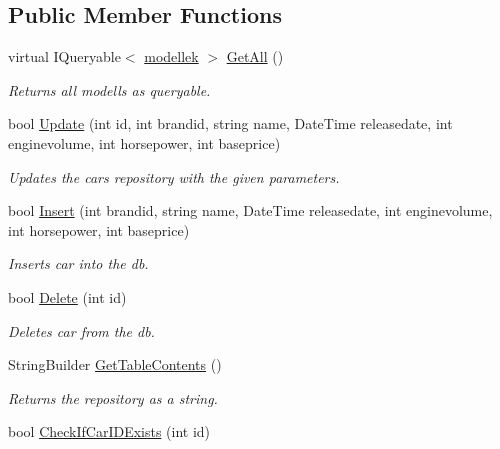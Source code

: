 \subsection*{Public Member Functions}
\begin{DoxyCompactItemize}
\item 
virtual I\+Queryable$<$ \mbox{\hyperlink{class_car_shop_1_1_data_1_1modellek}{modellek}} $>$ \mbox{\hyperlink{class_car_shop_1_1_repository_1_1_car_respository_aea527179a70f71d1d845a88d1de609f0}{Get\+All}} ()
\begin{DoxyCompactList}\small\item\em Returns all modells as queryable. \end{DoxyCompactList}\item 
bool \mbox{\hyperlink{class_car_shop_1_1_repository_1_1_car_respository_ac847da32c8bdeb91bfcc097ea8345d6c}{Update}} (int id, int brandid, string name, Date\+Time releasedate, int enginevolume, int horsepower, int baseprice)
\begin{DoxyCompactList}\small\item\em Updates the car\textquotesingle{}s repository with the given parameters. \end{DoxyCompactList}\item 
bool \mbox{\hyperlink{class_car_shop_1_1_repository_1_1_car_respository_aa4c68a6789697071168f24a158091140}{Insert}} (int brandid, string name, Date\+Time releasedate, int enginevolume, int horsepower, int baseprice)
\begin{DoxyCompactList}\small\item\em Inserts car into the db. \end{DoxyCompactList}\item 
bool \mbox{\hyperlink{class_car_shop_1_1_repository_1_1_car_respository_a79be7e5b4f1a0086039888ad4596cd6c}{Delete}} (int id)
\begin{DoxyCompactList}\small\item\em Deletes car from the db. \end{DoxyCompactList}\item 
String\+Builder \mbox{\hyperlink{class_car_shop_1_1_repository_1_1_car_respository_a813570f301ee59cfda45a893be49a663}{Get\+Table\+Contents}} ()
\begin{DoxyCompactList}\small\item\em Returns the repository as a string. \end{DoxyCompactList}\item 
bool \mbox{\hyperlink{class_car_shop_1_1_repository_1_1_car_respository_afc83ebf123476021e0ab66458b12d18a}{Check\+If\+Car\+I\+D\+Exists}} (int id)

\end{DoxyCompactItemize}
